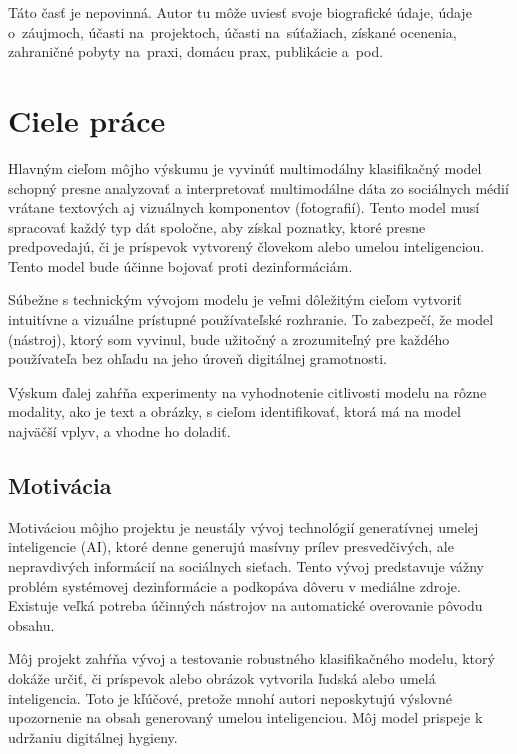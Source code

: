 \documentclass[]{tukediphc}
\begin{document}
\kslovnikterminov
%

%

%

%

%

%

%

%
%
%
%
%
%
%
\newpage
{}
\protect\label{page:posledna}
\curriculumvitae
Táto časť je nepovinná. Autor tu môže uviesť svoje biografické
údaje, údaje o~záujmoch, účasti na~projektoch, účasti na~súťažiach,
získané ocenenia, zahraničné pobyty na~praxi, domácu prax, publikácie
a~pod.
\kcurriculumvitae


\section{Ciele práce}
Hlavným cieľom môjho výskumu je vyvinúť multimodálny klasifikačný model schopný presne analyzovať a interpretovať multimodálne dáta zo sociálnych médií vrátane textových aj vizuálnych komponentov (fotografií). Tento model musí spracovať každý typ dát spoločne, aby získal poznatky, ktoré presne predpovedajú, či je príspevok vytvorený človekom alebo umelou inteligenciou. Tento model bude účinne bojovať proti dezinformáciám.

Súbežne s technickým vývojom modelu je veľmi dôležitým cieľom vytvoriť intuitívne a vizuálne prístupné používateľské rozhranie. To zabezpečí, že model (nástroj), ktorý som vyvinul, bude užitočný a zrozumiteľný pre každého používateľa bez ohľadu na jeho úroveň digitálnej gramotnosti.

Výskum ďalej zahŕňa experimenty na vyhodnotenie citlivosti modelu na rôzne modality, ako je text a obrázky, s cieľom identifikovať, ktorá má na model najväčší vplyv, a vhodne ho doladiť.


\subsection{Motivácia}
Motiváciou môjho projektu je neustály vývoj technológií generatívnej umelej inteligencie (AI), ktoré denne generujú masívny prílev presvedčivých, ale nepravdivých informácií na sociálnych sieťach. Tento vývoj predstavuje vážny problém systémovej dezinformácie a podkopáva dôveru v mediálne zdroje. Existuje veľká potreba účinných nástrojov na automatické overovanie pôvodu obsahu.

Môj projekt zahŕňa vývoj a testovanie robustného klasifikačného modelu, ktorý dokáže určiť, či príspevok alebo obrázok vytvorila ľudská alebo umelá inteligencia. Toto je kľúčové, pretože mnohí autori neposkytujú výslovné upozornenie na obsah generovaný umelou inteligenciou. Môj model prispeje k udržaniu digitálnej hygieny.
\end{document}
